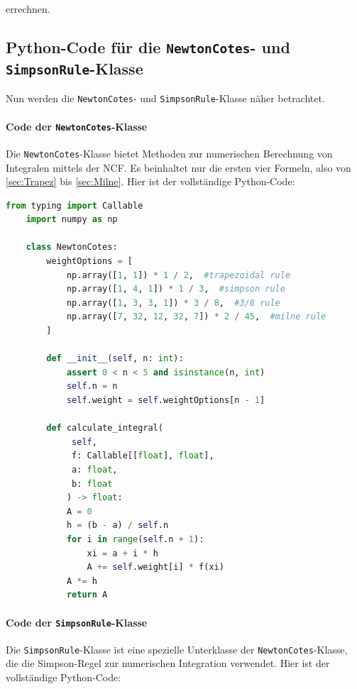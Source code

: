 errechnen.

\subsection{Python-Code für die \texttt{NewtonCotes}- und \texttt{SimpsonRule}-Klasse}
Nun werden die \texttt{NewtonCotes}- und \texttt{SimpsonRule}-Klasse näher betrachtet.

\paragraph{Code der \texttt{NewtonCotes}-Klasse}

Die \texttt{NewtonCotes}-Klasse bietet Methoden zur numerischen Berechnung von Integralen mittels der NCF. Es beinhaltet nur die ersten vier Formeln, also von \ref{sec:Trapez} bis \ref{sec:Milne}. Hier ist der vollständige Python-Code:

\begin{lstlisting}[language=Python, caption={Vollständiger Code der NewtonCotes-Klasse}, label={lst:NewtonCotesClass}]
    from typing import Callable
    import numpy as np
    
    class NewtonCotes:
        weightOptions = [
            np.array([1, 1]) * 1 / 2,  #trapezoidal rule
            np.array([1, 4, 1]) * 1 / 3,  #simpson rule
            np.array([1, 3, 3, 1]) * 3 / 8,  #3/8 rule
            np.array([7, 32, 12, 32, 7]) * 2 / 45,  #milne rule
        ]
    
        def __init__(self, n: int):
            assert 0 < n < 5 and isinstance(n, int)
            self.n = n
            self.weight = self.weightOptions[n - 1]
    
        def calculate_integral(
             self,
             f: Callable[[float], float],
             a: float,
             b: float
            ) -> float:
            A = 0
            h = (b - a) / self.n
            for i in range(self.n + 1):
                xi = a + i * h
                A += self.weight[i] * f(xi)
            A *= h
            return A
\end{lstlisting}

\paragraph{Code der \texttt{SimpsonRule}-Klasse}

Die \texttt{SimpsonRule}-Klasse ist eine spezielle Unterklasse der \texttt{NewtonCotes}-Klasse, die die Simpson-Regel zur numerischen Integration verwendet. Hier ist der vollständige Python-Code:

